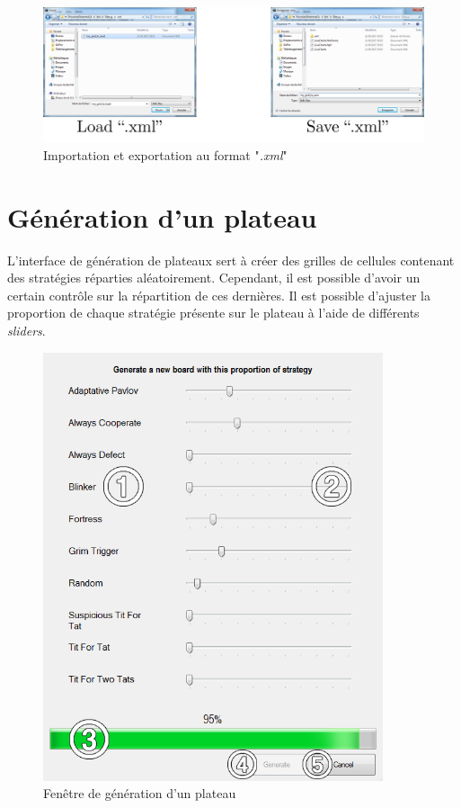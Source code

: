 \documentclass[a4paper, french]{article}
\begin{document}
\begin{figure}[htp]
    \centering
    \includegraphics[width=\linewidth]{import_export.png}
    \caption{Importation et exportation au format "\textit{.xml}"}
\end{figure}


\pagebreak
\section{Génération d'un plateau}
L'interface de génération de plateaux sert à créer des grilles de cellules contenant des stratégies réparties aléatoirement. Cependant, il est possible d'avoir un certain contrôle sur la répartition de ces dernières. Il est possible d'ajuster la proportion de chaque stratégie présente sur le plateau à l'aide de différents \textit{sliders}.

\begin{figure}[htp]
    \centering
    \includegraphics[width=10cm]{generation_view.png}
    \caption{Fenêtre de génération d'un plateau}
\end{figure}
\end{document}
